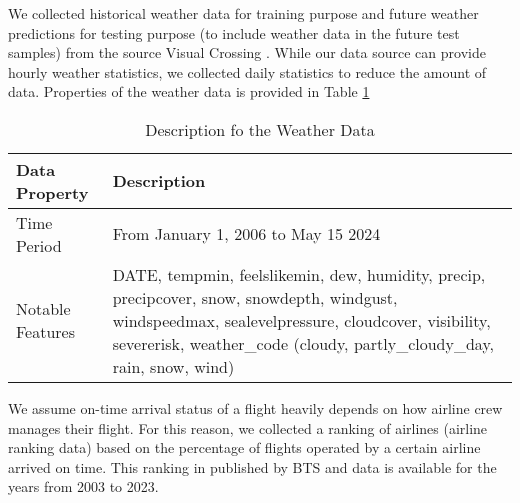
We collected historical weather data for training purpose and future weather predictions for testing purpose (to include weather data in the future test samples) from the source  Visual Crossing \cite{weatherdatasrc}.
While our data source 
can provide hourly weather statistics, we collected daily statistics to reduce the amount of data. Properties of the weather data is provided in Table \ref{tab:w_data}\\
\begin{table}[htbp]
	\centering
	\caption{Description fo the Weather Data}
	\begin{tabular}{| p{3.85cm}|p{3.85cm} |}
		\hline
		Data Property & Description \\
		\hline
		\hline
		Time Period & From January 1, 2006 to May 15 2024 \\
		\hline
		Notable Features & DATE, tempmin, feelslikemin, dew, humidity, precip, precipcover, snow, snowdepth, windgust, windspeedmax, sealevelpressure, cloudcover, visibility, severerisk, weather\_code (cloudy, partly\_cloudy\_day, rain, snow, wind)\\
		\hline
	\end{tabular}
	\label{tab:w_data}
\end{table}

We assume on-time arrival status of a flight heavily depends on how airline crew manages their flight.
For this reason, we collected a ranking of airlines (airline ranking data) based on the percentage of flights operated by a certain airline arrived on time.
This ranking in published by BTS \cite{airlineOnTimeArrival} and data is available for the years from 2003 to 2023.

